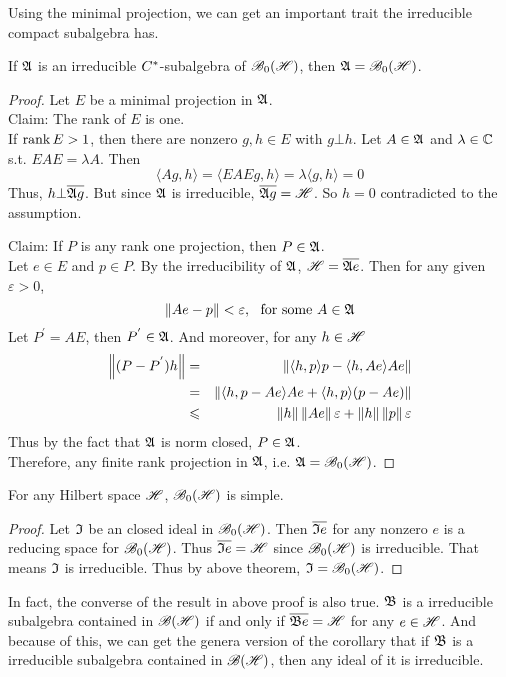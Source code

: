 Using the minimal projection, we can get an important trait the irreducible compact subalgebra has.
\begin{thm}
	If $\mathfrak{A}$ is an irreducible $C^{*}$-subalgebra of $\mathscr{B}_{0}\mathscr{(H)}$, then $\mathfrak{A} = \mathscr{B}_{0}\mathscr{(H)}$.
\end{thm}
\begin{proof}
	Let $E$ be a minimal projection in $\mathfrak{A}$.\\
	Claim: The rank of $E$ is one. \\
	If $\operatorname{rank}{E} > 1$, then there are nonzero $g,h \in E$ with $g \bot h$. Let $A \in \mathfrak{A}$ and $\lambda \in \mathbb{C}$ s.t. $EAE = \lambda A$. Then
	\begin{equation*}
		\langle Ag,h \rangle = \langle EAEg,h \rangle = \lambda \langle g,h \rangle = 0
	\end{equation*}
	Thus, $h \bot \overline{\mathfrak{A} g}$. But since $\mathfrak{A}$ is irreducible, $\overline{\mathfrak{A} g} = \mathscr{H}$. So $h = 0$ contradicted to the assumption.
	\item Claim: If $P$ is any rank one projection, then $P \in \mathfrak{A}$. \\
	Let $e \in E$ and $p \in P$. By the irreducibility of $\mathfrak{A}$, $\mathscr{H} = \overline{\mathfrak{A} e}$. Then for any given $\varepsilon > 0$, 
	\begin{equation*}
		\left\lVert Ae - p\right\lVert < \varepsilon,~ \text{ for some } A \in \mathfrak{A}
	\end{equation*}
	Let $P^{'} = AE$, then $P^{'} \in \mathfrak{A}$. And moreover, for any $h \in \mathscr{H}$
	\begin{eqnarray*}
		\left\lVert(P-P^{'})h\right\lVert &=& \left\lVert\langle h,p \rangle p - \langle h, Ae \rangle Ae\right\lVert\\ 
		&=& \left\lVert\langle h,p-Ae \rangle Ae + \langle h,p \rangle (p-Ae)\right\lVert \\
		&\leqslant& \left\lVert h\right\lVert \left\lVert Ae\right\lVert \varepsilon + \left\lVert h\right\lVert\left\lVert p\right\lVert \varepsilon
	\end{eqnarray*}
	Thus by the fact that $\mathfrak{A}$ is norm closed, $P \in \mathfrak{A}$. \\
	Therefore, any finite rank projection in $\mathfrak{A}$, i.e. $\mathfrak{A} = \mathscr{B}_{0}\mathscr{(H)}$.
\end{proof}

\begin{cor}
	For any Hilbert space $\mathscr{H}$, $\mathscr{B}_{0}\mathscr{(H)}$ is simple.
\end{cor}
\begin{proof}
	Let $\mathfrak{I}$ be an closed ideal in $\mathscr{B}_{0}\mathscr{(H)}$. Then $\overline{\mathfrak{I} e}$ for any nonzero $e$ is a reducing space for $\mathscr{B}_{0}\mathscr{(H)}$. Thus $\overline{\mathfrak{I} e} = \mathscr{H}$ since $\mathscr{B}_{0}\mathscr{(H)}$ is irreducible. That means $\mathfrak{I}$ is irreducible. Thus by above theorem, $\mathfrak{I} = \mathscr{B}_{0}\mathscr{(H)}$.
\end{proof}
\begin{rem}
	In fact, the converse of the result in above proof is also true. $\mathfrak{B}$ is a irreducible subalgebra contained in $\mathscr{B(H)}$ if and only if $\overline{\mathfrak{B} e} = \mathscr{H}$ for any $e \in \mathscr{H}$. And because of this, we can get the genera version of the corollary that if $\mathfrak{B}$ is a irreducible subalgebra contained in $\mathscr{B(H)}$, then any ideal of it is irreducible.
\end{rem}

